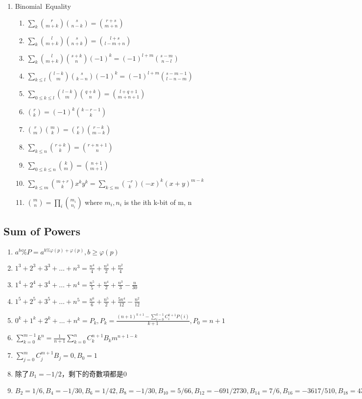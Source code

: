 \begin{enumerate}
\item Binomial\ Equality
	\begin{enumerate}\itemsep = -2pt
	    \item $\sum_k \binom{r}{m + k} \binom{s}{n - k} = \binom{r + s}{m + n}$
         \item $\sum_k \binom{l}{m + k} \binom{s}{n + k} = \binom{l + s}{l -m + n}$		
         \item $\sum_k \binom{l}{m + k} \binom{s + k}{n}(-1)^k = (-1)^{l + m} \binom{s - m}{n - l}$
		\item $\sum_{k\leq l} \binom{l - k}{m} \binom{s}{k - n}(-1)^k = (-1)^{l + m} \binom{s - m - 1}{l - n - m}$
		\item $\sum_{0 \leq k \leq l} \binom{l - k}{m} \binom{q + k}{n} = \binom{l + q + 1}{m + n + 1}$
		\item $\binom{r}{k} = (-1)^k\binom{k - r - 1}{k}$
		\item $\binom{r}{m} \binom{m}{k} = \binom{r}{k} \binom{r - k}{m - k}$
		\item $\sum_{k\leq n} \binom{r + k}{k} = \binom{r + n + 1}{n}$
		\item $\sum_{0\leq k \leq n} \binom{k}{m} = \binom{n + 1}{m + 1}$
		\item $\sum_{k\leq m}\binom{m + r}{k}x^ky^k = \sum_{k\leq m}\binom{-r}{k}(-x)^k (x+y)^{m-k}$	
		\item $\binom{m}{n} = \prod_i \binom{m_i}{n_i}$ where $m_i, n_i$ is the ith k-bit of m, n
	\end{enumerate}
\end{enumerate}


\subsection{Sum of Powers}
\begin{enumerate}\itemsep = -3pt
	\item $a^b\%P=a^{b\% \varphi (p)+\varphi (p)},b\geq \varphi (p)$
	\item $1^3+2^3+3^3+\ldots +n^3=\frac{n^4}{4}+\frac{n^3}{2}+\frac{n^2}{4}$
	\item $1^4+2^4+3^4+\ldots +n^4=\frac{n^5}{5}+\frac{n^4}{2}+\frac{n^3}{3}-\frac{n}{30}$
	\item $1^5+2^5+3^5+\ldots +n^5=\frac{n^6}{6}+\frac{n^5}{2}+\frac{5n^4}{12}-\frac{n^2}{12}$
	\item $0^k+1^k+2^k+\ldots +n^k = P_k,P_k=\frac{(n+1)^{k+1}-\sum_{i=0}^{k-1}C_i^{k+1}P(i)}{k+1},P_0=n+1$
	\item $\sum_{k=0}^{m-1}k^n=\frac{1}{n+1}\sum_{k=0}^{n}C_k^{n+1}B_km^{n+1-k}$
	\item $\sum_{j=0}^{m}C_j^{m+1}B_j=0,B_0=1$
	\item 除了$B_1=-1/2$，剩下的奇數項都是$0$
	\item $B_2=1/6,B_4=-1/30,B_6=1/42,B_8=-1/30,B_{10}=5/66,B_{12}=-691/2730,B_{14}=7/6,B_{16}=-3617/510,B_{18}=43867/798,B_{20}=-174611/330,$
\end{enumerate}

